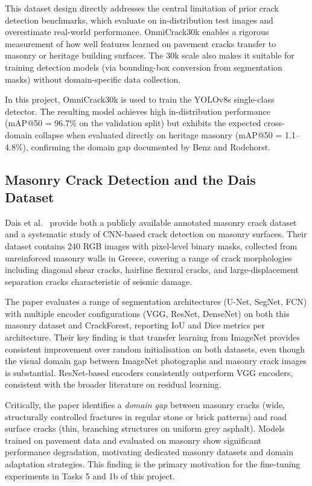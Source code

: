\documentclass[12pt,a4paper]{article}
\begin{document}
This dataset design directly addresses the central limitation of prior crack detection benchmarks, which evaluate on in-distribution test images and overestimate real-world performance. OmniCrack30k enables a rigorous measurement of how well features learned on pavement cracks transfer to masonry or heritage building surfaces. The 30k scale also makes it suitable for training detection models (via bounding-box conversion from segmentation masks) without domain-specific data collection.

In this project, OmniCrack30k is used to train the YOLOv8s single-class detector. The resulting model achieves high in-distribution performance (mAP@50 = 96.7\% on the validation split) but exhibits the expected cross-domain collapse when evaluated directly on heritage masonry (mAP@50 = 1.1--4.8\%), confirming the domain gap documented by Benz and Rodehorst.

\subsection{Masonry Crack Detection and the Dais Dataset}

Dais et al.~\cite{dais2021crack} provide both a publicly available annotated masonry crack dataset and a systematic study of CNN-based crack detection on masonry surfaces. Their dataset contains 240 RGB images with pixel-level binary masks, collected from unreinforced masonry walls in Greece, covering a range of crack morphologies including diagonal shear cracks, hairline flexural cracks, and large-displacement separation cracks characteristic of seismic damage.

The paper evaluates a range of segmentation architectures (U-Net, SegNet, FCN) with multiple encoder configurations (VGG, ResNet, DenseNet) on both this masonry dataset and CrackForest, reporting IoU and Dice metrics per architecture. Their key finding is that transfer learning from ImageNet provides consistent improvement over random initialisation on both datasets, even though the visual domain gap between ImageNet photographs and masonry crack images is substantial. ResNet-based encoders consistently outperform VGG encoders, consistent with the broader literature on residual learning.

Critically, the paper identifies a \textit{domain gap} between masonry cracks (wide, structurally controlled fractures in regular stone or brick patterns) and road surface cracks (thin, branching structures on uniform grey asphalt). Models trained on pavement data and evaluated on masonry show significant performance degradation, motivating dedicated masonry datasets and domain adaptation strategies. This finding is the primary motivation for the fine-tuning experiments in Tasks 5 and 1b of this project.
\end{document}
